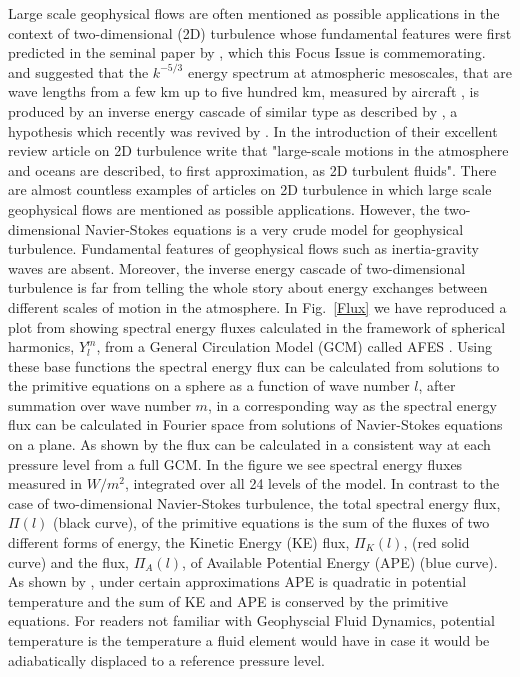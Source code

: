 Large scale geophysical flows are often mentioned as possible applications in the context of two-dimensional (2D) turbulence whose fundamental features were first predicted in the seminal paper  by \citet{Kraichnan1967}, which this Focus Issue is commemorating.
\citet{Gage:1979} and \citet{Lilly:1983} suggested that the $ k^{-5/3} $ energy spectrum at atmospheric mesoscales, that are wave lengths from a few km up to five hundred km, measured by aircraft \citep{Nastrom-Gage:1985, Lindborg1999}, is produced by an inverse energy cascade of similar type as described by \citet{Kraichnan1967}, a  hypothesis which recently was revived by \citet{Xia2011}.
In the introduction of their excellent review article on 2D turbulence \citet{Boffetta2012} write that "large-scale motions in the atmosphere and oceans are described, to first approximation, as 2D turbulent fluids". There are almost countless examples of articles on 2D turbulence in which large scale geophysical flows are mentioned as possible applications.
However, the two-dimensional Navier-Stokes equations is  a very crude model for geophysical turbulence. Fundamental features of geophysical flows such as inertia-gravity waves are absent. Moreover, the inverse energy cascade of two-dimensional turbulence is far from telling the whole story  about energy exchanges between different scales of motion in the atmosphere. In Fig.~\ref{Flux} we have reproduced  a plot from \citet{Augier-Lindborg:2013} showing spectral energy fluxes calculated in the framework of spherical harmonics, $ Y_l^m $, from a General Circulation Model (GCM) called AFES \citep{Hamilton-Takahashi-Ohfuchi:2008}.
Using these base functions the spectral energy flux can be calculated from solutions to the primitive equations \citep{Vallis:book} on a sphere as a function of wave number $ l $, after summation over wave number $ m $, in a corresponding way as the spectral energy flux can be calculated in Fourier space from solutions of Navier-Stokes equations on a plane.
As shown by  \citet{Augier-Lindborg:2013} the flux can be calculated in a consistent way at each pressure level from a full  GCM. In the figure  we see spectral energy fluxes measured in $ W/m^2 $, integrated over all 24 levels of the model. In contrast to the case of  two-dimensional Navier-Stokes turbulence, the total spectral energy flux, $ \Pi (l) $  (black curve), of the primitive equations is the sum of the fluxes of two different forms of energy, the Kinetic Energy (KE) flux, $ \Pi_K(l) $, (red solid curve) and the flux, $ \Pi_A(l) $, of Available Potential Energy (APE) (blue curve). As shown by \citet{Lorenz:1955}, under certain approximations APE is quadratic in potential temperature and the sum of KE and APE is conserved by the primitive equations. For readers not familiar with Geophyscial Fluid Dynamics, potential temperature is the temperature a fluid element would have in case it would be adiabatically displaced to a reference pressure level.
